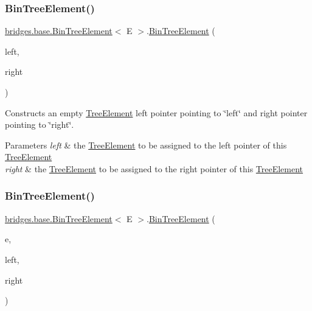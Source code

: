 \subsubsection{\texorpdfstring{BinTreeElement()}{BinTreeElement()}\hspace{0.1cm}{\footnotesize\ttfamily [4/5]}}
{\footnotesize\ttfamily \mbox{\hyperlink{classbridges_1_1base_1_1_bin_tree_element}{bridges.\+base.\+Bin\+Tree\+Element}}$<$ E $>$.\mbox{\hyperlink{classbridges_1_1base_1_1_bin_tree_element}{Bin\+Tree\+Element}} (\begin{DoxyParamCaption}\item[{\mbox{\hyperlink{classbridges_1_1base_1_1_bin_tree_element}{Bin\+Tree\+Element}}$<$ E $>$}]{left,  }\item[{\mbox{\hyperlink{classbridges_1_1base_1_1_bin_tree_element}{Bin\+Tree\+Element}}$<$ E $>$}]{right }\end{DoxyParamCaption})}

Constructs an empty \mbox{\hyperlink{classbridges_1_1base_1_1_tree_element}{Tree\+Element}} left pointer pointing to \char`\"{}left\char`\"{} and right pointer pointing to \char`\"{}right\char`\"{}.


\begin{DoxyParams}{Parameters}
{\em left} & the \mbox{\hyperlink{classbridges_1_1base_1_1_tree_element}{Tree\+Element}} to be assigned to the left pointer of this \mbox{\hyperlink{classbridges_1_1base_1_1_tree_element}{Tree\+Element}} \\
\hline
{\em right} & the \mbox{\hyperlink{classbridges_1_1base_1_1_tree_element}{Tree\+Element}} to be assigned to the right pointer of this \mbox{\hyperlink{classbridges_1_1base_1_1_tree_element}{Tree\+Element}} \\
\hline
\end{DoxyParams}
\mbox{\label{classbridges_1_1base_1_1_bin_tree_element_a37f3def3cdf4a9eccf577d0ff3c704e9}} 
\subsubsection{\texorpdfstring{BinTreeElement()}{BinTreeElement()}\hspace{0.1cm}{\footnotesize\ttfamily [5/5]}}
{\footnotesize\ttfamily \mbox{\hyperlink{classbridges_1_1base_1_1_bin_tree_element}{bridges.\+base.\+Bin\+Tree\+Element}}$<$ E $>$.\mbox{\hyperlink{classbridges_1_1base_1_1_bin_tree_element}{Bin\+Tree\+Element}} (\begin{DoxyParamCaption}\item[{E}]{e,  }\item[{\mbox{\hyperlink{classbridges_1_1base_1_1_bin_tree_element}{Bin\+Tree\+Element}}$<$ E $>$}]{left,  }\item[{\mbox{\hyperlink{classbridges_1_1base_1_1_bin_tree_element}{Bin\+Tree\+Element}}$<$ E $>$}]{right }\end{DoxyParamCaption})}

